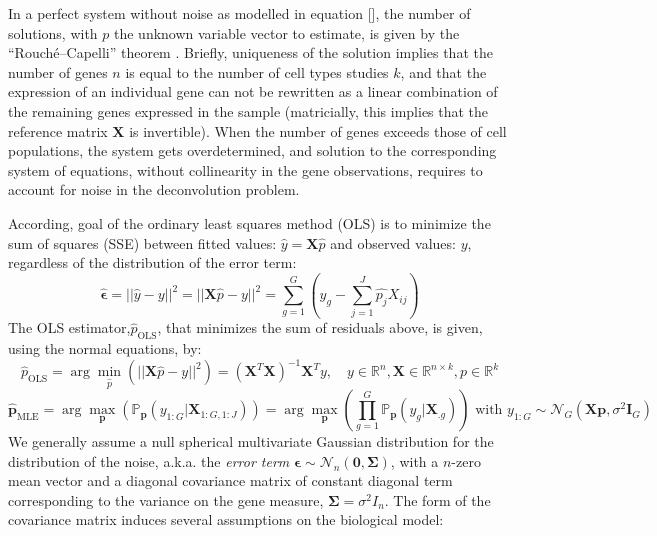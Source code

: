 In a perfect system without noise as modelled in equation {[}{]}, the
number of solutions, with \(p\) the unknown variable vector to estimate,
is given by the ``Rouché--Capelli'' theorem
\autocite{shafarevich_remizov13}. Briefly, uniqueness of the solution implies that the number of
genes \(n\) is equal to the number of cell types studies \(k\), and that
the expression of an individual gene can not be rewritten as a linear
combination of the remaining genes expressed in the sample (matricially,
this implies that the reference matrix \(\boldsymbol{X}\) is invertible).
When the number of genes exceeds those of cell populations, the system
gets overdetermined, and solution to the corresponding system of
equations, without collinearity in the gene observations, requires to
account for noise in the deconvolution problem.

According, goal of the ordinary least squares method (OLS) is to
minimize the sum of squares (SSE) between fitted values:
\(\hat{y} = \boldsymbol{X}\hat{p}\) and observed values: \(y\), regardless
of the distribution of the error term: \[
\hat{\mathbf{\epsilon}} = ||\hat{y} - y||^2 = ||\boldsymbol{X}\hat{p} - y||^2 = \sum_{g=1}^G \left( y_g - \sum_{j=1}^J \hat{p_j} X_{ij}\right)
\] The OLS estimator,\(\hat{p}_{\text{OLS}}\), that minimizes the sum of
residuals above, is given, using the normal equations, by: \[
\hat{p}_{\text{OLS}} = \arg \min_{\hat{p}} \left( ||\boldsymbol{X}\hat{p} - y||^2 \right) = (\boldsymbol{X}^T\boldsymbol{X})^{-1}\boldsymbol{X}^Ty, \quad y \in \mathbb{R}^n, \boldsymbol{X} \in \mathbb{R}^{n \times k}, p \in \mathbb{R}^k
\] \[
\hat{\mathbf{p}}_\text{MLE} = \arg \max_{\mathbf{p}} \left( \mathbb{P}_\mathbf{p} (y_{1:G}|\boldsymbol{X}_{1:G, 1:J})\right)= \arg \max_{\mathbf{p}} \left( \prod_{g=1}^G  \mathbb{P}_\mathbf{p} (y_{g}|\boldsymbol{X}_{.g})\right) \text { with } y_{1:G} \sim \mathcal{N}_G(\boldsymbol{X} \mathbf{p}, \sigma^2\mathbf{I}_G)
\] We generally assume a null spherical multivariate Gaussian
distribution for the distribution of the noise, a.k.a. the \emph{error
term}
\(\mathbf{\epsilon} \sim \mathcal{N}_n (\mathbf{0}, \mathbf{\Sigma})\),
with a \(n\)-zero mean vector and a diagonal covariance matrix of
constant diagonal term corresponding to the variance on the gene
measure, \(\mathbf{\Sigma} = \sigma^2 I_n\). The form of the covariance
matrix induces several assumptions on the biological model:

